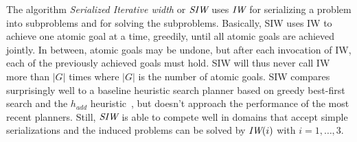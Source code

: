 \documentclass[letterpaper]{article}
\begin{document}
The algorithm \emph{Serialized Iterative width} or ${\textit{SIW}}$ uses ${\textit{IW}}$
for serializing a problem into subproblems and for solving the
subproblems.  Basically, SIW uses IW to achieve one atomic goal at a
time, greedily, until all atomic goals are achieved jointly. In
between, atomic goals may be undone, but after each invocation of IW,
each of the previously achieved goals must hold. SIW will thus never
call IW more than $|G|$ times where $|G|$ is the number of atomic
goals. SIW compares surprisingly well to a baseline heuristic search
planner based on greedy best-first search and the $h_{add}$
heuristic~\cite{bonet:aij-hsp}, but doesn't approach the performance
of the most recent planners. Still, ${\textit{SIW}}$ is able to compete well in
domains that accept simple serializations and the induced problems can
be solved by ${\textit{IW}}(i)$ with $i=1,\ldots,3$.
\end{document}
